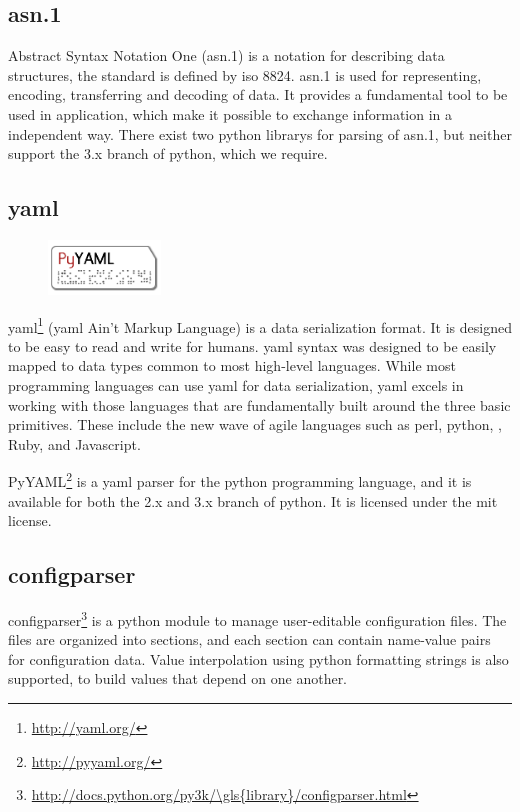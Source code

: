\subsection{\Gls{asn.1}}
Abstract Syntax Notation One (\Gls{asn.1}) is a notation for describing data
structures, the standard is defined by \Gls{iso} 8824. \Gls{asn.1} is used for
representing, encoding, transferring and decoding of data. It provides a
fundamental tool to be used in application, which make it possible to exchange
information in a independent way. There exist two \Gls{python} \glspl{library} for parsing
of  \Gls{asn.1}, but neither support the 3.x \gls{branch} of \Gls{python}, which we require.

\subsection{\Gls{yaml}}
\label{sec:pre:yaml}
\begin{figure}
	\vspace{-30pt}
	\includegraphics[width=3cm]{./planning/img/pyyaml_logo}
	\vspace{-30pt}
\end{figure}
\Gls{yaml}\footnote{\url{http://yaml.org/}} (\Gls{yaml} Ain't Markup Language) is a \gls{data serialization} format.
It is designed to be easy to read and write for humans.
\Gls{yaml} syntax was designed to be easily mapped to data types common to most
high-level languages. While most programming languages can use \Gls{yaml} for data
serialization, \Gls{yaml} excels in working with those languages that are
fundamentally built around the three basic primitives. These include the new
wave of agile languages such as \Gls{perl}, \Gls{python}, , \Gls{Ruby}, and \Gls{Javascript}.

PyYAML\footnote{\url{http://pyyaml.org/}} is a \Gls{yaml} \gls{parser} for the \Gls{python}
programming language, and it is available for both the 2.x and 3.x \gls{branch} of
\Gls{python}. It is licensed under the \Gls{mit} license.

\subsection{configparser}
configparser\footnote{\url{http://docs.python.org/py3k/\gls{library}/configparser.html}}
is a \Gls{python} module to manage user-editable configuration files. The
files are organized into sections, and each section can contain name-value
pairs for configuration data. Value interpolation using \Gls{python} formatting
strings is also supported, to build values that depend on one another.


